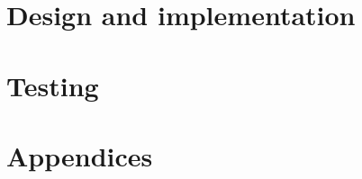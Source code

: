 \documentclass[11pt,a4paper]{report}	%
\theoremstyle{definition}
\begin{document}
\chapter{Design and implementation}
\label{chap:design}
	
	

\chapter{Testing}
	

\newpage



\appendix
\chapter*{Appendices}
\renewcommand{\thesection}{\Alph{section}}

\end{document}
